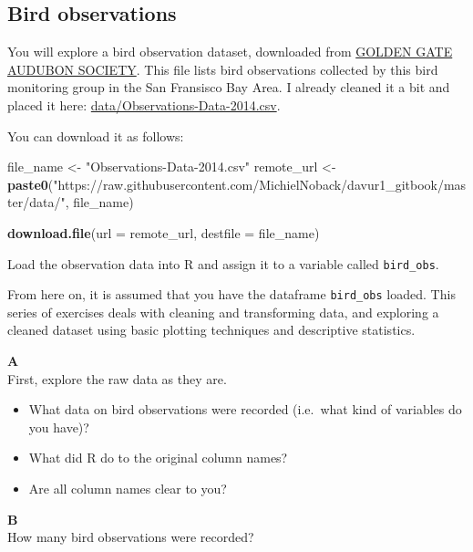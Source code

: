 \documentclass[]{book}
\newenvironment{Shaded}{\begin{snugshade}}{\end{snugshade}}
\newcommand{\DataTypeTok}[1]{\textcolor[rgb]{0.13,0.29,0.53}{#1}}
\newcommand{\KeywordTok}[1]{\textcolor[rgb]{0.13,0.29,0.53}{\textbf{#1}}}
\newcommand{\NormalTok}[1]{#1}
\newcommand{\StringTok}[1]{\textcolor[rgb]{0.31,0.60,0.02}{#1}}
\providecommand{\tightlist}{%
  \setlength{\itemsep}{0pt}\setlength{\parskip}{0pt}}
\begin{document}
\hypertarget{bird-observations}{%
\subsection{Bird observations}\label{bird-observations}}

You will explore a bird observation dataset, downloaded from \href{http://goldengateaudubon.org/birding-resources/observations/}{GOLDEN GATE AUDUBON SOCIETY}. This file lists bird observations collected by this bird monitoring group in the San Fransisco Bay Area. I already cleaned it a bit and placed it here: \url{data/Observations-Data-2014.csv}.

You can download it as follows:

\begin{Shaded}
\begin{Highlighting}[]
\NormalTok{file_name <-}\StringTok{ "Observations-Data-2014.csv"}
\NormalTok{remote_url <-}\StringTok{ }\KeywordTok{paste0}\NormalTok{(}\StringTok{"https://raw.githubusercontent.com/MichielNoback/davur1_gitbook/master/data/"}\NormalTok{, file_name)}

\KeywordTok{download.file}\NormalTok{(}\DataTypeTok{url =}\NormalTok{ remote_url, }\DataTypeTok{destfile =}\NormalTok{ file_name)}
\end{Highlighting}
\end{Shaded}

Load the observation data into R and assign it to a variable called \texttt{bird\_obs}.

From here on, it is assumed that you have the dataframe \texttt{bird\_obs} loaded. This series of exercises deals with cleaning and transforming data, and exploring a cleaned dataset using basic plotting techniques and descriptive statistics.

\textbf{A}\\
First, explore the raw data as they are.

\begin{itemize}
\tightlist
\item
  What data on bird observations were recorded (i.e.~what kind of variables do you have)?
\item
  What did R do to the original column names?
\item
  Are all column names clear to you?
\end{itemize}

\textbf{B}\\
How many bird observations were recorded?
\end{document}
